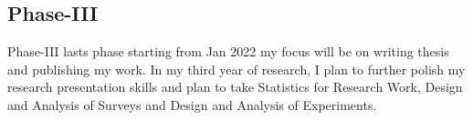 \documentclass[10pt]{llncs}
\begin{document}
%
\subsection{Phase-III}
Phase-III lasts phase starting from Jan 2022 my focus will be on writing thesis and publishing my work.
In my third year of research, I plan to further polish my research presentation skills and plan to take Statistics for Research Work, Design and Analysis of Surveys and Design and Analysis of Experiments.

%

%

\footnotesize{
%
%
}
%
\end{document}
